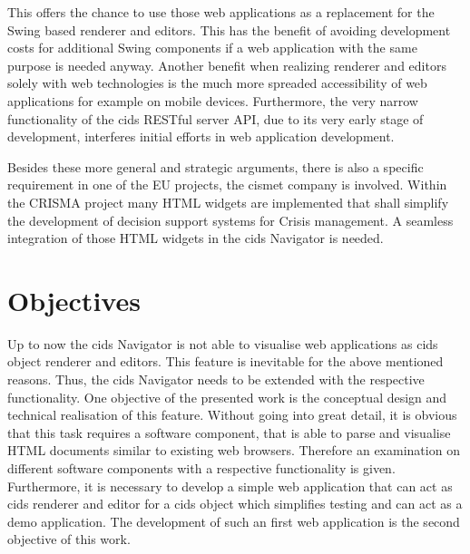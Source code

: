 This offers the chance to use those web applications as a replacement for the Swing based renderer and editors.
This has the benefit of avoiding development costs for additional Swing components if a web application with the same purpose is needed anyway.
Another benefit when realizing renderer and editors solely with web technologies is the much more spreaded accessibility of web applications for example on mobile devices. 
Furthermore, the very narrow functionality of the cids RESTful server API, due to its very early stage of development, interferes initial efforts in web application development.
 
Besides these more general and strategic arguments, there is also a specific requirement in one of the EU projects, the cismet company is involved.
Within the CRISMA project many HTML widgets are implemented that shall simplify the development of decision support systems for Crisis management.
A seamless integration of those HTML widgets in the cids Navigator is needed.

\section{Objectives}\label{chap:intro-objectives}

Up to now the cids Navigator is not able to visualise web applications as cids object renderer and editors.
This feature is inevitable for the above mentioned reasons.
Thus, the cids Navigator needs to be extended with the respective functionality.
One objective of the presented work is the conceptual design and technical realisation of this feature.
Without going into great detail, it is obvious that this task requires a software component, that is able to parse and visualise HTML documents similar to existing web browsers.
Therefore an examination on different software components with a respective functionality is given.
Furthermore, it is necessary to develop a simple web application that can act as cids renderer and editor for a cids object which simplifies testing and can act as a demo application.
The development of such an first web application is the second objective of this work.

